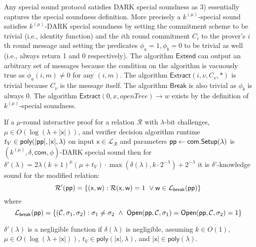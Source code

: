 \begin{remark} Any special sound protocol satisfies DARK special soundness as 3) essentially captures the special soundness definition. More precisely a $k^{(\mu)}$-special sound satisfies $k^{(\mu)}$-DARK special soundness by setting the commitment scheme to be trivial (i.e., identity function) and the $i$th round commitment $C_i$ to the prover's $i$th round message and setting the predicates $\phi_a=1, \phi_b=0$ to be trivial as well (i.e., always return 1 and 0 respectively). The algorithm $\textsf{Extend}$ can output an arbitrary set of messages because the condition on the algorithm is vacuously true as $\phi_a(i,m) \neq 0$ for any $(i,m)$. The algorithm $\textsf{Extract}(i, \nu, C_\nu, *)$ is trivial because $C_\nu$ is the message itself. The algorithm $\textsf{Break}$ is also trivial as $\phi_b$ is always $0$. The algorithm $\textsf{Extract}(0, x, openTree) \rightarrow w$ exists by the definition of $k^{(\mu)}$-special soundness. %
\end{remark}



\begin{theorem}\label{thm:DARKExtractor} If a $\mu$-round interactive proof for a relation $\mathcal{R}$ with $\lambda$-bit challenges, $\mu \in O(\log(\lambda + |\mathsf{x}|))$, and verifier decision algorithm runtime $t_V \in \textsf{poly}(|\textsf{pp}|, |\mathsf{x}|, \lambda)$ on input $\mathsf{x} \in \mathcal{L}_\mathcal{R}$ and parameters $\textsf{pp} \gets \textsf{com}.\textsf{{Setup}}(\lambda)$ is $(k^{(\mu)}, \delta, \textsf{com}, \phi)$-DARK special sound then for $\delta'(\lambda) = 2\lambda (k+1)^\mu (\mu + t_V) \cdot \max(\delta(\lambda), k \cdot 2^{-\lambda}) + 2^{-\lambda}$ it is $\delta'$-knowledge sound for the modified relation:
$$\mathcal{R'}(\textsf{pp}) = \{(\mathsf{x}, \mathsf{w}): \mathcal{R}(\mathsf{x}, \mathsf{w}) = 1 \  \vee \mathsf{w} \in \mathcal{L}_\textsf{break}(\textsf{pp})\} $$
 where 
 $$\mathcal{L}_\textsf{break}(\crs) = \{ (\mathcal{C}, \sigma_1, \sigma_2) :   \sigma_1 \neq \sigma_2 \ \wedge \ \open(\crs,\mathcal{C}, \sigma_1) = \open(\crs,\mathcal{C}, \sigma_2) = 1    \} $$ 

\end{theorem} 
\begin{remark} $\delta'(\lambda)$ is a negligible function if $\delta(\lambda)$ is negligible, assuming $k \in O(1)$, $\mu \in O(\log(\lambda + |\mathsf{x}|))$, $t_V \in \textsf{poly}(|\mathsf{x}|, \lambda)$, and $|\mathsf{x}| \in \textsf{poly}(\lambda)$. 	
\end{remark}

